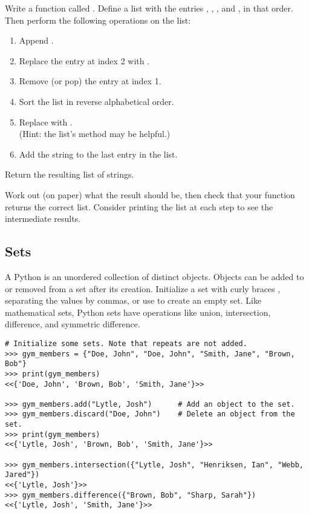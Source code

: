 \begin{problem} %
Write a function called .
Define a list with the entries , , , and , in that order.
Then perform the following operations on the list:
\begin{enumerate}
\item Append .
\item Replace the entry at index 2 with .
\item Remove (or pop) the entry at index 1.
\item Sort the list in reverse alphabetical order.
\item Replace  with .
\\(Hint: the list's  method may be helpful.)
\item Add the string  to the last entry in the list.
\end{enumerate}
Return the resulting list of strings.

Work out (on paper) what the result should be, then check that your function returns the correct list.
Consider printing the list at each step to see the intermediate results.
\end{problem}

\subsection*{Sets} %

A Python  is an unordered collection of distinct objects.
Objects can be added to or removed from a set after its creation.
Initialize a set with curly braces \li{\{ \}}, separating the values by commas, or use  to create an empty set.
Like mathematical sets, Python sets have operations like union, intersection,
difference, and symmetric difference.

\begin{lstlisting}
# Initialize some sets. Note that repeats are not added.
>>> gym_members = {"Doe, John", "Doe, John", "Smith, Jane", "Brown, Bob"}
>>> print(gym_members)
<<{'Doe, John', 'Brown, Bob', 'Smith, Jane'}>>

>>> gym_members.add("Lytle, Josh")      # Add an object to the set.
>>> gym_members.discard("Doe, John")    # Delete an object from the set.
>>> print(gym_members)
<<{'Lytle, Josh', 'Brown, Bob', 'Smith, Jane'}>>

>>> gym_members.intersection({"Lytle, Josh", "Henriksen, Ian", "Webb, Jared"})
<<{'Lytle, Josh'}>>
>>> gym_members.difference({"Brown, Bob", "Sharp, Sarah"})
<<{'Lytle, Josh', 'Smith, Jane'}>>
\end{lstlisting}

